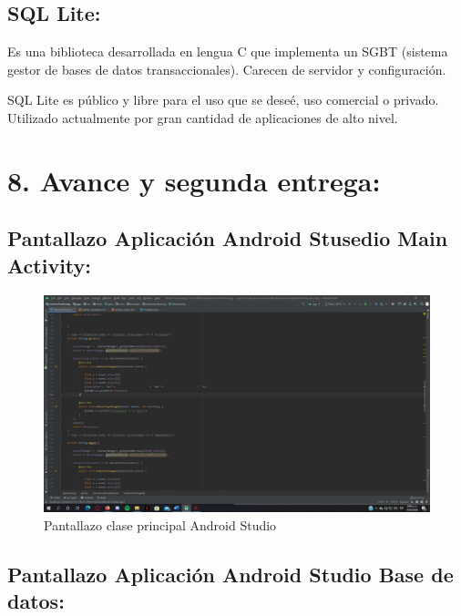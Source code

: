 \documentclass[conference,compsoc,onecolumn]{IEEEtran}
\begin{document}
\subsection{SQL Lite:}

Es una biblioteca desarrollada en lengua C que implementa un SGBT (sistema gestor de bases de datos transaccionales). Carecen de servidor y configuración.\newline

SQL Lite es público y libre para el uso que se deseé, uso comercial o privado. Utilizado actualmente por gran cantidad de aplicaciones de alto nivel.  \newline

\section{8.	Avance y segunda entrega:}

\subsection{Pantallazo Aplicación Android Stusedio Main Activity:}

 \begin{figure}[H]
\centering
\includegraphics[keepaspectratio, scale=0.5, width=\textwidth]{Imagenes/Imagen5.jpg}
\caption{Pantallazo clase principal Android Studio}
\end{figure}

\subsection{Pantallazo Aplicación Android Studio Base de datos:}
\end{document}

